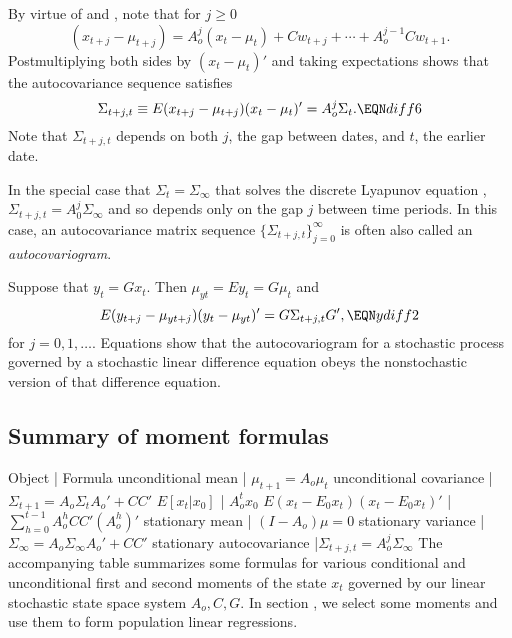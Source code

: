 By virtue of   and , note that for $j \geq 0$
$$ (x_{t+j} - \mu_{t+j}) = A_o^j (x_t - \mu_t) + C w_{t+j} + \cdots
  +   A_o^{j-1} C w_{t+1}.  $$
Postmultiplying both sides by $(x_t - \mu_t)'$
and taking expectations shows that
the autocovariance sequence satisfies
$$ \Sigma_{t+j,t} \equiv E (x_{t+j} - \mu_{t+j}) (x_t - \mu_t)' =
       A_o^j \Sigma_t. \EQN diff6 $$
Note that $\Sigma_{t+j,t}$ depends on both $j$, the gap between dates, and $t$, the earlier date.

In the special case that $\Sigma_t = \Sigma_\infty$ that solves the discrete Lyapunov equation
, $\Sigma_{t+j,t} = A_0^j \Sigma_\infty$ and so depends only on the gap $j$ between time
periods. In this case, an autocovariance  matrix sequence $\{\Sigma_{t+j,t}\}_{j=0}^\infty$ is often  also called an {\it
autocovariogram}.  %

%

Suppose that $y_t = G x_t$.  Then
 $\mu_{yt}= E y_t = G \mu_t$ and
$$ E (y_{t+j} - \mu_{yt+j}) (y_t - \mu_{yt})'
                              = G \Sigma_{t+j,t} G',  \EQN ydiff2  $$
for $j=0, 1,\ldots$. Equations   show that %
the autocovariogram for a stochastic   process governed by a stochastic linear
difference equation  obeys the nonstochastic version of that
difference equation.



\subsection{Summary of moment formulas}
\medskip



Object | Formula \cr
unconditional mean   |  $ \mu_{t+1} = A_o \mu_t$ \nr
unconditional covariance | $\Sigma_{t+1} = A_o \Sigma_{t} A_o' + C C' $ \cr
 $E [x_t\vert x_0] $ | $A_o^t x_0$ \nr
$E(x_t - E_0 x_t)(x_t - E_0 x_t)'$ | $\sum_{h=0}^{t-1} A_o^h C C' (A_o^h)'$ \cr
stationary mean | $(I - A_o)\mu =0$ \nr
stationary variance | $\Sigma_\infty = A_o \Sigma_\infty A_o' + C C' $ \nr
stationary autocovariance |$ \Sigma_{t+j,t} = A_o^j \Sigma_\infty$
\endruledtable
The accompanying table summarizes some formulas for various conditional and unconditional first and second moments of
the state $x_t$ governed by our linear stochastic state space system $A_o, C, G$.
In section , we select some moments and use them to form  population linear regressions.


